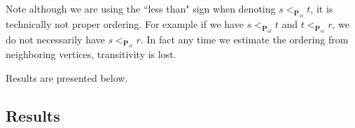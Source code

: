 \begin{remark}
	Note although we are using the ``less than" sign when denoting $s <_{\pmb{P}_{st}} t$, it is technically not proper ordering. For example if we have $s <_{\pmb{P}_{st}} t$ and $t <_{\pmb{P}_{st}} r$, we do not necessarily have $s <_{\pmb{P}_{st}} r$. In fact any time we estimate the ordering from neighboring vertices, transitivity is lost.
\end{remark}

Results are presented below. 

\subsection{Results}





